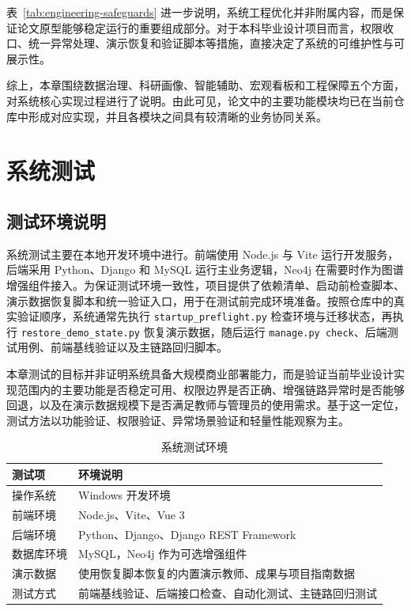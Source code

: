 \documentclass[12pt,a4paper]{ctexbook}
\begin{document}
表~\ref{tab:engineering-safeguards} 进一步说明，系统工程优化并非附属内容，而是保证论文原型能够稳定运行的重要组成部分。对于本科毕业设计项目而言，权限收口、统一异常处理、演示恢复和验证脚本等措施，直接决定了系统的可维护性与可展示性。

综上，本章围绕数据治理、科研画像、智能辅助、宏观看板和工程保障五个方面，对系统核心实现过程进行了说明。由此可见，论文中的主要功能模块均已在当前仓库中形成对应实现，并且各模块之间具有较清晰的业务协同关系。

\chapter{系统测试}
\section{测试环境说明}
系统测试主要在本地开发环境中进行。前端使用 Node.js 与 Vite 运行开发服务，后端采用 Python、Django 和 MySQL 运行主业务逻辑，Neo4j 在需要时作为图谱增强组件接入。为保证测试环境一致性，项目提供了依赖清单、启动前检查脚本、演示数据恢复脚本和统一验证入口，用于在测试前完成环境准备。按照仓库中的真实验证顺序，系统通常先执行 \texttt{startup\_preflight.py} 检查环境与迁移状态，再执行 \texttt{restore\_demo\_state.py} 恢复演示数据，随后运行 \texttt{manage.py check}、后端测试用例、前端基线验证以及主链路回归脚本。

本章测试的目标并非证明系统具备大规模商业部署能力，而是验证当前毕业设计实现范围内的主要功能是否稳定可用、权限边界是否正确、增强链路异常时是否能够回退，以及在演示数据规模下是否满足教师与管理员的使用需求。基于这一定位，测试方法以功能验证、权限验证、异常场景验证和轻量性能观察为主。

\begin{table}[H]
  \centering
  \small
  \caption{系统测试环境}
  \label{tab:test-environment}
  \begin{tabular}{p{3cm}p{9cm}}
    \toprule
    测试项 & 环境说明 \\
    \midrule
    操作系统 & Windows 开发环境 \\
    前端环境 & Node.js、Vite、Vue 3 \\
    后端环境 & Python、Django、Django REST Framework \\
    数据库环境 & MySQL，Neo4j 作为可选增强组件 \\
    演示数据 & 使用恢复脚本恢复的内置演示教师、成果与项目指南数据 \\
    测试方式 & 前端基线验证、后端接口检查、自动化测试、主链路回归测试 \\
    \bottomrule
  \end{tabular}
\end{table}
\end{document}
